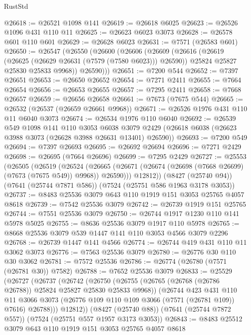 \begin{lexlean}{RustStd}
\begin{coremodule}
{\begin{coremodule}
{{{{{{{{{{{{{{{{{{{{{{{{{{{{{{{{@26618 := @26521 @1098 @141
@26619 := @26618 @6025
@26623 := @26526 @1096 @431 @110 @11
@26625 := @26623 @6023 @3073
@26628 := @26578 @601 @110 @601
@26629 := @26628 @6023
@26631 := @7571 (@26583 @601)
@26650 := @26547
    (@26550
      (@26600
        (@26606
          (@26609
            (@26616
              (@26619 (@26625 (@26629 @26631 (@7579 (@7580 @6023))) @26590))
              @25824
              @25827
              @25830
              @25833
              @9968))
          @26590)))
@26651 := @7200 @544
@26652 := @7397 @26651
@26653 := @26650 @26652
@26654 := @7271 @2411
@26655 := @7664 @26654
@26656 := @26653 @26655
@26657 := @7295 @2411
@26658 := @7668 @26657
@26659 := @26656 @26658
@26661 := @7673 (@7675 @544)
@26665 := @26532 (@26537 (@26659 @26661 @9968))
@26671 := @26526 @1976 @431 @110 @11 @6040 @3073
@26674 := @26534 @1976 @110 @6040
@26692 := @26539
    @549
    @1098
    @141
    @110
    @3053
    @6038
    @3079
    @2429
    (@26618 @6038 (@26623 @3988 @3073 (@26628 @3988 @26631 @13401) @26590))
@26693 := @7200 @549
@26694 := @7397 @26693
@26695 := @26692 @26694
@26696 := @7271 @2429
@26698 := @26695 (@7664 @26696)
@26699 := @7295 @2429
@26727 := @25553
    (@26505
      (@26519
        (@26524
          (@26665 (@26671 (@26674 (@26698 (@7668 @26699) (@7673 (@7675 @549)) @9968)) @26590)))
        @12812))
    (@8427 (@25740 @94))
    (@7641 (@25744 @7871 @586))
    (@7524 (@25751 @586 @1963 @3178 @3053))
@26737 := @8483 @25536 @3079 @643 @110 @1919 @151 @3053 @25765 @4057 @8618
@26739 := @7542 @25536 @3079
@26742 := @26739 @1919 @151 @25765
@26744 := @7551 @25536 @3079
@26750 := @26744 @1917 @1230 @110 @141 @5978 @5025
@26755 := @8636 @25536 @3079 @1917 @110 @5978
@26765 := @8668 @25536 @3079 @539 @1447 @141 @110 @3053 @4566 @3079 @2296
@26768 := @26739 @1447 @141 @4566
@26774 := @26744 @419 @431 @110 @11 @3062 @3073
@26776 := @7563 @25536 @3079
@26780 := @26776 @30 @110 @30 @3062
@26781 := @7572 @25536
@26786 := @26774 (@26780 (@7571 (@26781 @30)) @7582)
@26788 := @7652 @25536 @3079
@26833 := @25529
    (@26727
      (@26737
        (@26742
          (@26750
            (@26755 (@26765 (@26768 (@26786 @26788)) @25824 @25827 @25830 @25833 @9968))
            (@26744
              @423
              @431
              @110
              @11
              @3066
              @3073
              (@26776 @109 @110 @109 @3066 (@7571 (@26781 @109)) @7616)
              @26788)))
        @12812))
    (@8427 (@25740 @88))
    (@7641 (@25744 @7872 @557))
    (@7524 (@25751 @557 @1957 @3173 @3053))
@26843 := @8483 @25512 @3079 @643 @110 @1919 @151 @3053 @25765 @4057 @8618
}}}}}}}}}}}}}}}}}}}}}}}}}}}}}}}}
\end{coremodule}}
\end{coremodule}
\end{lexlean}
